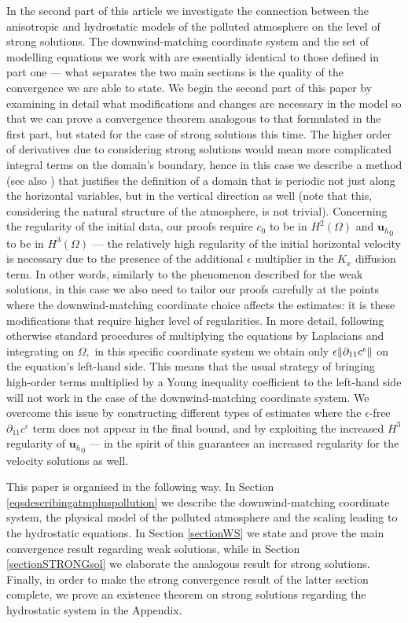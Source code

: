 \documentclass[11pt]{article}
\begin{document}
In the second part of this article we investigate the connection between the anisotropic and hydrostatic models of the polluted atmosphere on the level of strong solutions. The downwind-matching coordinate system and the set of modelling equations we work with are essentially identical to those defined in part one --- what separates the two main sections is the quality of the convergence we are able to state. We begin the second part of this paper by examining in detail what modifications and changes are necessary in the model so that we can prove a convergence theorem analogous to that formulated in the first part, but stated for the case of strong solutions this time. The higher order of derivatives due to considering strong solutions would mean more complicated integral terms on the domain's boundary, hence in this case we describe a method (see also \cite{cao2014local}) that justifies the definition of a domain that is periodic not just along the horizontal variables, but in the vertical direction as well (note that this, considering the natural structure of the atmosphere, is not trivial). Concerning the regularity of the initial data, our proofs require $c_0$ to be in $H^2(\Omega)$ and ${\mathbf{u}_h}_0$ to be in $H^3(\Omega)$ --- the relatively high regularity of the initial horizontal velocity is necessary due to the presence of the additional $\epsilon$ multiplier in the $K_x$ diffusion term. In other words, similarly to the phenomenon described for the weak solutions, in this case we also need to tailor our proofs carefully at the points where the downwind-matching coordinate choice affects the estimates: it is these modifications that require higher level of regularities. In more detail, following otherwise standard procedures of multiplying the equations by Laplacians and integrating on $\Omega,$ in this specific coordinate system we obtain only $\epsilon \norm{\partial_{11} c^\epsilon}$ on the equation's left-hand side. This means that the usual strategy of bringing high-order terms multiplied by a Young inequality coefficient to the left-hand side will not work in the case of the downwind-matching coordinate system. We overcome this issue by constructing different types of estimates where the $\epsilon$-free $\partial_{11} c^\epsilon$ term does not appear in the final bound, and by exploiting the increased $H^3$ regularity of ${\mathbf{u}_h}_0$ --- in the spirit of \cite{li2019primitive} this guarantees an increased regularity for the velocity solutions as well.

This paper is organised in the following way. In Section \ref{eqsdescribingatmpluspollution} we describe the downwind-matching coordinate system, the physical model of the polluted atmosphere and the scaling leading to the hydrostatic equations. In Section \ref{sectionWS} we state and prove the main convergence result regarding weak solutions, while in Section \ref{sectionSTRONGsol} we elaborate the analogous result for strong solutions. Finally, in order to make the strong convergence result of the latter section complete, we prove an existence theorem on strong solutions regarding the hydrostatic system in the Appendix.
\end{document}
